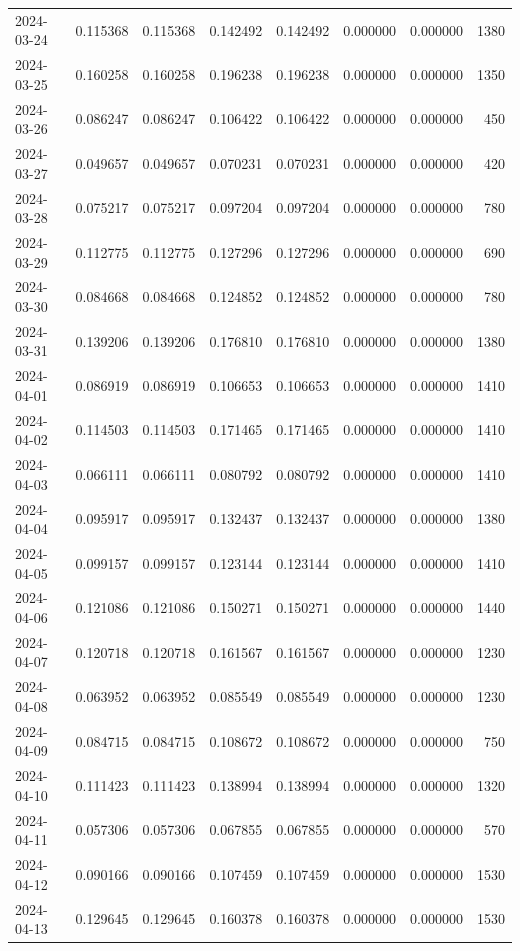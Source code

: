 \begin{tabular}{lrrrrrrr}
2024-03-24 & 0.115368 & 0.115368 & 0.142492 & 0.142492 & 0.000000 & 0.000000 & 1380 \\
2024-03-25 & 0.160258 & 0.160258 & 0.196238 & 0.196238 & 0.000000 & 0.000000 & 1350 \\
2024-03-26 & 0.086247 & 0.086247 & 0.106422 & 0.106422 & 0.000000 & 0.000000 & 450 \\
2024-03-27 & 0.049657 & 0.049657 & 0.070231 & 0.070231 & 0.000000 & 0.000000 & 420 \\
2024-03-28 & 0.075217 & 0.075217 & 0.097204 & 0.097204 & 0.000000 & 0.000000 & 780 \\
2024-03-29 & 0.112775 & 0.112775 & 0.127296 & 0.127296 & 0.000000 & 0.000000 & 690 \\
2024-03-30 & 0.084668 & 0.084668 & 0.124852 & 0.124852 & 0.000000 & 0.000000 & 780 \\
2024-03-31 & 0.139206 & 0.139206 & 0.176810 & 0.176810 & 0.000000 & 0.000000 & 1380 \\
2024-04-01 & 0.086919 & 0.086919 & 0.106653 & 0.106653 & 0.000000 & 0.000000 & 1410 \\
2024-04-02 & 0.114503 & 0.114503 & 0.171465 & 0.171465 & 0.000000 & 0.000000 & 1410 \\
2024-04-03 & 0.066111 & 0.066111 & 0.080792 & 0.080792 & 0.000000 & 0.000000 & 1410 \\
2024-04-04 & 0.095917 & 0.095917 & 0.132437 & 0.132437 & 0.000000 & 0.000000 & 1380 \\
2024-04-05 & 0.099157 & 0.099157 & 0.123144 & 0.123144 & 0.000000 & 0.000000 & 1410 \\
2024-04-06 & 0.121086 & 0.121086 & 0.150271 & 0.150271 & 0.000000 & 0.000000 & 1440 \\
2024-04-07 & 0.120718 & 0.120718 & 0.161567 & 0.161567 & 0.000000 & 0.000000 & 1230 \\
2024-04-08 & 0.063952 & 0.063952 & 0.085549 & 0.085549 & 0.000000 & 0.000000 & 1230 \\
2024-04-09 & 0.084715 & 0.084715 & 0.108672 & 0.108672 & 0.000000 & 0.000000 & 750 \\
2024-04-10 & 0.111423 & 0.111423 & 0.138994 & 0.138994 & 0.000000 & 0.000000 & 1320 \\
2024-04-11 & 0.057306 & 0.057306 & 0.067855 & 0.067855 & 0.000000 & 0.000000 & 570 \\
2024-04-12 & 0.090166 & 0.090166 & 0.107459 & 0.107459 & 0.000000 & 0.000000 & 1530 \\
2024-04-13 & 0.129645 & 0.129645 & 0.160378 & 0.160378 & 0.000000 & 0.000000 & 1530 \\

\end{tabular}
